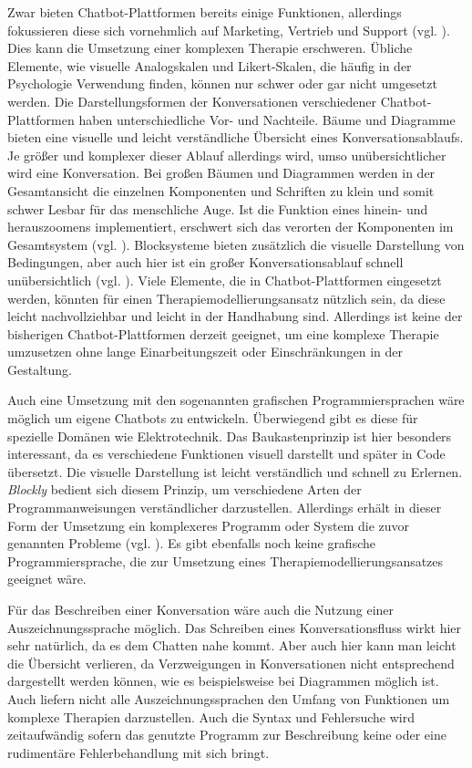 Zwar bieten Chatbot-Plattformen bereits einige Funktionen, allerdings fokussieren diese sich vornehmlich auf Marketing, Vertrieb und Support (vgl. \cite{Chatfuel3:online} \cite{Converse15:online} \cite{ManyChat78:online}). Dies kann die Umsetzung einer komplexen Therapie erschweren. Übliche Elemente, wie visuelle Analogskalen und Likert-Skalen, die häufig in der Psychologie Verwendung finden, können nur schwer oder gar nicht umgesetzt werden. Die Darstellungsformen der Konversationen verschiedener Chatbot-Plattformen haben unterschiedliche Vor- und Nachteile. Bäume und Diagramme bieten eine visuelle und leicht verständliche Übersicht eines Konversationsablaufs. Je größer und komplexer dieser Ablauf allerdings wird, umso unübersichtlicher wird eine Konversation. Bei großen Bäumen und Diagrammen werden in der Gesamtansicht die einzelnen Komponenten und Schriften zu klein und somit schwer Lesbar für das menschliche Auge. Ist die Funktion eines hinein- und herauszoomens implementiert, erschwert sich das verorten der Komponenten im Gesamtsystem (vgl. \cite{Hornbaek2003}). Blocksysteme bieten zusätzlich die visuelle Darstellung von Bedingungen, aber auch hier ist ein großer Konversationsablauf schnell unübersichtlich (vgl. \cite{Hornbaek2003}). Viele Elemente, die in Chatbot-Plattformen eingesetzt werden, könnten für einen Therapiemodellierungsansatz nützlich sein, da diese leicht nachvollziehbar und leicht in der Handhabung sind. Allerdings ist keine der bisherigen Chatbot-Plattformen derzeit geeignet, um eine komplexe Therapie umzusetzen ohne lange Einarbeitungszeit oder Einschränkungen in der Gestaltung. 

Auch eine Umsetzung mit den sogenannten grafischen Programmiersprachen wäre möglich um eigene Chatbots zu entwickeln. Überwiegend gibt es diese für spezielle Domänen wie Elektrotechnik. Das Baukastenprinzip ist hier besonders interessant, da es verschiedene Funktionen visuell darstellt und später in Code übersetzt. Die visuelle Darstellung ist leicht verständlich und schnell zu Erlernen. \emph{Blockly} bedient sich diesem Prinzip, um verschiedene Arten der Programmanweisungen verständlicher darzustellen. Allerdings erhält in dieser Form der Umsetzung ein komplexeres Programm oder System die zuvor genannten Probleme (vgl. \cite{Hornbaek2003}). Es gibt ebenfalls noch keine grafische Programmiersprache, die zur Umsetzung eines Therapiemodellierungsansatzes geeignet wäre. 

Für das Beschreiben einer Konversation wäre auch die Nutzung einer Auszeichnungssprache möglich. Das Schreiben eines Konversationsfluss wirkt hier sehr natürlich, da es dem Chatten nahe kommt. Aber auch hier kann man leicht die Übersicht verlieren, da Verzweigungen in Konversationen nicht entsprechend dargestellt werden können, wie es beispielsweise bei Diagrammen möglich ist. Auch liefern nicht alle Auszeichnungssprachen den Umfang von Funktionen um komplexe Therapien darzustellen. Auch die Syntax und Fehlersuche wird zeitaufwändig sofern das genutzte Programm zur Beschreibung keine oder eine rudimentäre Fehlerbehandlung mit sich bringt.  

